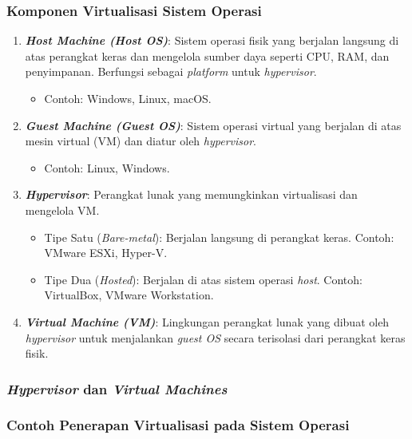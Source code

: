 \documentclass[12pt]{article}
\begin{document}
\subsubsection{Komponen Virtualisasi Sistem Operasi}
\begin{enumerate}
    \item \textbf{\textit{Host Machine (Host OS)}}:
        Sistem operasi fisik yang berjalan langsung di atas perangkat keras dan mengelola sumber daya seperti CPU, RAM, dan penyimpanan. Berfungsi sebagai \textit{platform} untuk \textit{hypervisor}.
    \begin{itemize}
        \item Contoh: Windows, Linux, macOS.
    \end{itemize}
    
    \item \textbf{\textit{Guest Machine (Guest OS)}}:
        Sistem operasi virtual yang berjalan di atas mesin virtual (VM) dan diatur oleh \textit{hypervisor}. 
    \begin{itemize}
        \item Contoh: Linux, Windows.
    \end{itemize}
    
    \item \textbf{\textit{Hypervisor}}:
    Perangkat lunak yang memungkinkan virtualisasi dan mengelola VM.
    \begin{itemize}
        \item Tipe Satu (\textit{Bare-metal}): Berjalan langsung di perangkat keras. Contoh: VMware ESXi, Hyper-V.
        \item Tipe Dua (\textit{Hosted}): Berjalan di atas sistem operasi \textit{host}. Contoh: VirtualBox, VMware Workstation.
    \end{itemize}
    
    \item \textbf{\textit{Virtual Machine (VM)}}:
    Lingkungan perangkat lunak yang dibuat oleh \textit{hypervisor} untuk menjalankan \textit{guest OS} secara terisolasi dari perangkat keras fisik.
\end{enumerate}

\subsubsection{\textit{Hypervisor} dan \textit{Virtual Machines}}
\subsubsection{Contoh Penerapan Virtualisasi pada Sistem Operasi}
\end{document}
